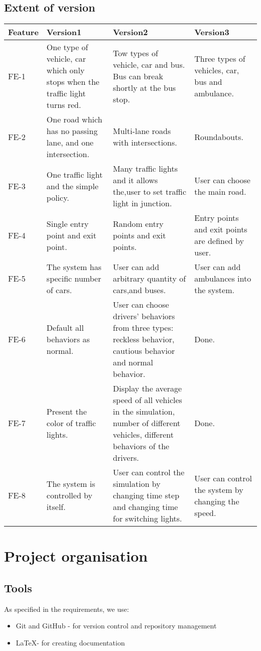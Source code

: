 \documentclass[a4paper,12pt]{article}
\begin{document}
\subsection{Extent of version}
\begin{table}[!htbp]
\centering
\begin{tabular}{|p{1.2cm}|p{3.8cm}|p{4.5cm}|p{3cm}|}
\hline
Feature & Version1 & Version2  & Version3\\
\hline
FE-1& One type of vehicle, car which only stops when the traffic light turns red. & Tow types of vehicle, car and bus. Bus can break shortly at the bus stop. & Three types of vehicles, car, bus and ambulance.\\
\hline
FE-2& One road which has no passing lane, and one intersection. & Multi-lane roads with intersections. & Roundabouts.\\
\hline
FE-3& One traffic light and the simple policy. & Many traffic lights and it allows the,user to set traffic light in junction. & User can choose the main road.\\
\hline
FE-4& Single entry point and exit point. & Random entry points and exit points. & Entry points and exit points are defined by user.\\
\hline
FE-5& The system has specific number of cars. & User can add arbitrary quantity of cars,and buses. & User can add ambulances into the system.\\
\hline
FE-6& Default all behaviors as normal. & User can choose drivers' behaviors from three types: reckless behavior, cautious behavior and normal behavior. & Done.\\
\hline
FE-7& Present the color of traffic lights. & Display the average speed of all vehicles in the simulation, number of different vehicles, different behaviors of the drivers. & Done.\\
\hline
FE-8& The system is controlled by itself. & User can control the simulation by changing time step and changing time for switching lights. & User can control the system by changing the speed.\\
\hline
\end{tabular}
\end{table}



\section{Project organisation}
\subsection{Tools}
As specified in the requirements, we use:
\begin{itemize}
    \item{Git and GitHub - for version control and repository management}
    \item{\LaTeX - for creating documentation}
\end{itemize}
\end{document}
